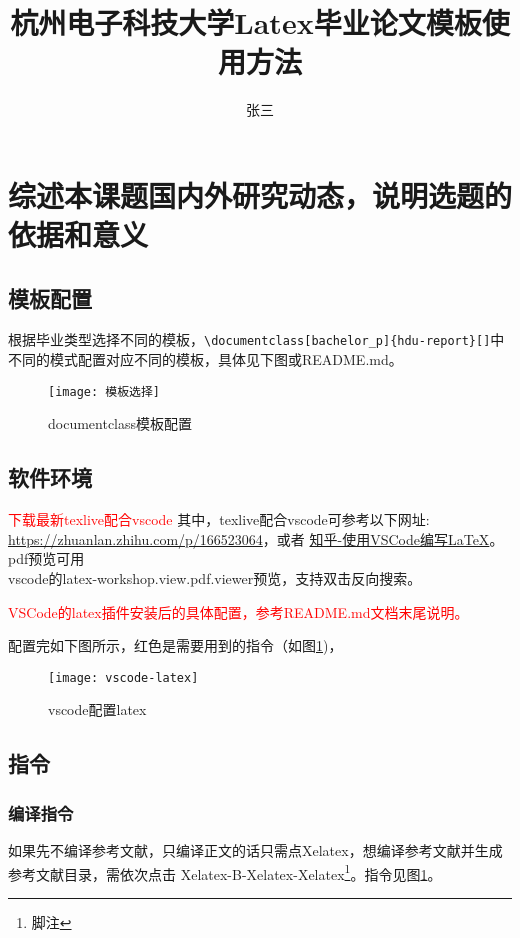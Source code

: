 \documentclass[bachelor_p]{hdu-report}
\title{杭州电子科技大学Latex毕业论文模板使用方法}{Munual of latex on thesis for HDU}%
\author{张三}{San Zhang}%
\begin{document}
\makecover


\section{综述本课题国内外研究动态，说明选题的依据和意义}
\subsection{模板配置}
根据毕业类型选择不同的模板，\verb+\documentclass[bachelor_p]{hdu-report}[]+中不同的模式配置对应不同的模板，具体见下图或README.md。
 \begin{figure}[!htb]
  \centering
  \texttt{[image: 模板选择]}
  \caption{documentclass模板配置}
\end{figure}
\subsection{软件环境}
\textcolor{red}{下载最新texlive配合vscode}
其中，texlive配合vscode可参考以下网址:\\
\url{https://zhuanlan.zhihu.com/p/166523064}，或者 \href{https://zhuanlan.zhihu.com/p/38178015}{知乎-使用VSCode编写LaTeX}。
pdf预览可用\\
vscode的latex-workshop.view.pdf.viewer预览，支持双击反向搜索。

\textcolor{red}{VSCode的latex插件安装后的具体配置，参考README.md文档末尾说明。}

配置完如下图所示，红色是需要用到的指令（如图\ref{fig_vs_latex})，
 \begin{figure}[!htb]
  \centering
  \texttt{[image: vscode-latex]}
  \caption{vscode配置latex}
  \label{fig_vs_latex}
\end{figure}

\subsection{指令}
\subsubsection{编译指令}
如果先不编译参考文献，只编译正文的话只需点Xelatex，想编译参考文献并生成参考文献目录，需依次点击 Xelatex-B-Xelatex-Xelatex\footnote{脚注}。指令见图\ref{fig_vs_latex}。

\end{document}
